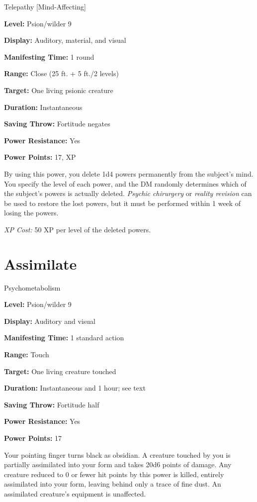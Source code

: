 \documentclass{article}
\begin{document}
Telepathy [Mind-Affecting]

\textbf{Level:} Psion/wilder 9

\textbf{Display:} Auditory, material, and visual

\textbf{Manifesting Time:} 1 round

\textbf{Range:} Close (25 ft. + 5 ft./2 levels)

\textbf{Target:} One living psionic creature

\textbf{Duration:} Instantaneous

\textbf{Saving Throw:} Fortitude negates

\textbf{Power Resistance:} Yes

\textbf{Power Points:} 17, XP

By using this power, you delete 1d4 powers permanently from the subject's mind. 
You specify the level of each power, and the DM randomly determines which of the 
subject's powers is actually deleted. \textit{Psychic chirurgery }or \textit{reality 
revision }can be used to restore the lost powers, but it must be performed within 
1 week of losing the powers.

\textit{XP Cost: }50 XP per level of the deleted powers.

\vspace{12pt}
\section*{Assimilate}

Psychometabolism

\textbf{Level:} Psion/wilder 9

\textbf{Display:} Auditory and visual

\textbf{Manifesting Time:} 1 standard action

\textbf{Range:} Touch

\textbf{Target:} One living creature touched

\textbf{Duration:} Instantaneous and 1 hour; see text

\textbf{Saving Throw:} Fortitude half

\textbf{Power Resistance:} Yes

\textbf{Power Points:} 17

Your pointing finger turns black as obsidian. A creature touched by you is partially 
assimilated into your form and takes 20d6 points of damage. Any creature reduced 
to 0 or fewer hit points by this power is killed, entirely assimilated into your 
form, leaving behind only a trace of fine dust. An assimilated creature's equipment 
is unaffected.
\end{document}

